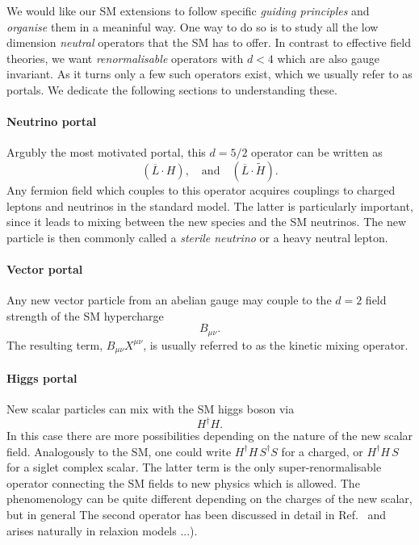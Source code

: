 We would like our SM extensions to follow specific \emph{guiding principles} and \emph{organise} them in a meaninful way. One way to do so is to study all the low dimension \emph{neutral} operators that the SM has to offer. In contrast to effective field theories, we want \emph{renormalisable} operators with $d<4$ which are also gauge invariant. As it turns only a few such operators exist, which we usually refer to as portals. We dedicate the following sections to understanding these.

\paragraph{Neutrino portal} 

Argubly the most motivated portal, this $d=5/2$ operator can be written as
\begin{equation}
 \left( \overline{L} \cdot H\right), \quad \mathrm{and}\quad \left( \overline{L} \cdot \tilde{H}\right).
\end{equation}
Any fermion field which couples to this operator acquires couplings to charged leptons and neutrinos in the standard model. The latter is particularly important, since it leads to mixing between the new species and the SM neutrinos. The new particle is then commonly called a \emph{sterile neutrino} or a heavy neutral lepton.

\paragraph{Vector portal}

Any new vector particle from an abelian gauge may couple to the $d=2$ field strength of the SM hypercharge
\begin{equation}
B_{\mu\nu}.
\end{equation}
The resulting term, $B_{\mu\nu} X^{\mu\nu}$, is usually referred to as the kinetic mixing operator.

\paragraph{Higgs portal}

New scalar particles can mix with the SM higgs boson via 
\begin{equation}
 H^\dagger H.
\end{equation}
In this case there are more possibilities depending on the nature of the new scalar field. Analogously to the SM, one could write  $H^\dagger H \, S^\dagger S$ for a charged, or $H^\dagger H\, S $ for a siglet complex scalar. The latter term is the only super-renormalisable operator connecting the SM fields to new physics which is allowed.  The phenomenology can be quite different depending on the charges of the new scalar, but in general The second operator has been discussed in detail in Ref.~\cite{Fradette:2018hhl} and arises naturally in relaxion models ...).

